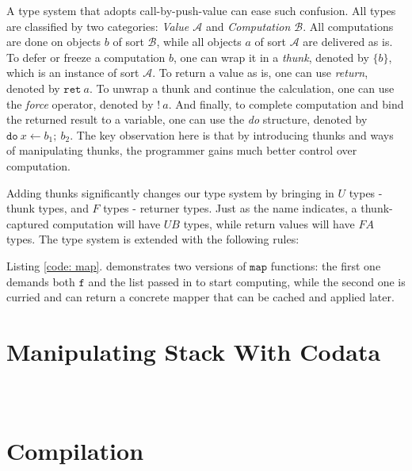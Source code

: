 \documentclass[acmsmall,nonacm]{acmart}
\begin{document}
A type system that adopts call-by-push-value can ease such confusion. All types are classified by two categories: \textit{Value $\mathcal{A}$} and \textit{Computation $\mathcal{B}$}. All computations are done on objects $b$ of sort $\mathcal{B}$, while all objects $a$ of sort $\mathcal{A}$ are delivered as is. To defer or freeze a computation $b$, one can wrap it in a \textit{thunk}, denoted by $\{ b \}$, which is an instance of sort $\mathcal{A}$. To return a value as is, one can use \textit{return}, denoted by $\texttt{ret}~a$. To unwrap a thunk and continue the calculation, one can use the \textit{force} operator, denoted by $!~a$. And finally, to complete computation and bind the returned result to a variable, one can use the \textit{do} structure, denoted by $\texttt{do}~x \leftarrow b_1;~b_2$. The key observation here is that by introducing thunks and ways of manipulating thunks, the programmer gains much better control over computation.

Adding thunks significantly changes our type system by bringing in $U$ types - thunk types, and $F$ types - returner types. Just as the name indicates, a thunk-captured computation will have $U B$ types, while return values will have $F A$ types. The type system is extended with the following rules:


Listing \ref{code: map}. demonstrates two versions of $\texttt{map}$ functions: the first one demands both $\texttt{f}$ and the list passed in to start computing, while the second one is curried and can return a concrete mapper that can be cached and applied later.

\section{Manipulating Stack With Codata}

\inputminted{Haskell}{examples/abort.zydeco}

\begin{listing}[h]
    \begin{multicols}{2}
        \inputminted{Haskell}{examples/sumfn.zydeco}
        \vfill
        \inputminted{Haskell}{examples/sumco.zydeco}
        \vfill
    \end{multicols}
    \label{code: codata}
\end{listing}

\section{Compilation}
\end{document}
